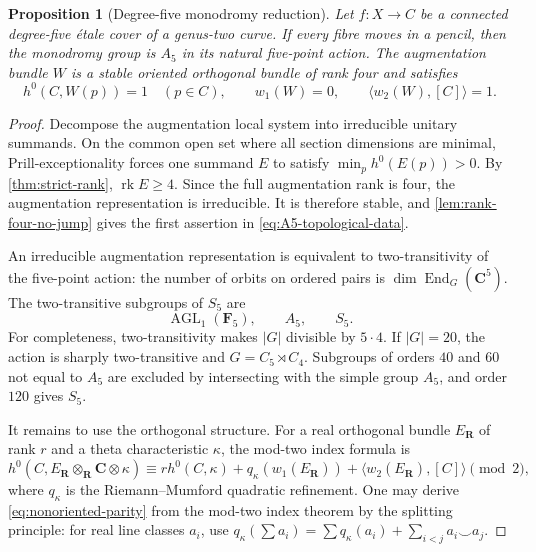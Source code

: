 \documentclass[11pt,reqno]{amsart}
\numberwithin{equation}{section}
\newtheorem{proposition}[proposition]{Proposition}
\theoremstyle{remark}
\DeclareMathOperator{\rk}{rk}
\newcommand{\bC}{\mathbf C}
\begin{document}
\begin{proposition}[Degree-five monodromy reduction]
\label{prop:degree-five-reduction}
Let \(f\colon X\to C\) be a connected degree-five \'etale cover of a
genus-two curve.  If every fibre moves in a pencil, then the monodromy
group is \(A_5\) in its natural five-point action.  The augmentation
bundle \(W\) is a stable oriented orthogonal bundle of rank four and
satisfies
\[
 h^0(C,W(p))=1\quad(p\in C),\qquad
 w_1(W)=0,\qquad \langle w_2(W),[C]\rangle=1.
\tag{6.19}\label{eq:A5-topological-data}
\]
\end{proposition}

\begin{proof}
Decompose the augmentation local system into irreducible unitary
summands.  On the common open set where all section dimensions are
minimal, Prill-exceptionality forces one summand \(E\) to satisfy
\(\min_p h^0(E(p))>0\).  By \cref{thm:strict-rank},
\(\rk E\geq4\).  Since the full augmentation rank is four, the
augmentation representation is irreducible.  It is therefore stable,
and \cref{lem:rank-four-no-jump} gives the first assertion in
\eqref{eq:A5-topological-data}.

An irreducible augmentation representation is equivalent to
two-transitivity of the five-point action: the number of orbits on
ordered pairs is
\(\dim\operatorname{End}_G(\bC^5)\).  The two-transitive subgroups of
\(S_5\) are
\[
 \operatorname{AGL}_1(\mathbf F_5),\qquad A_5,\qquad S_5.
\tag{6.20}\label{eq:degree-five-groups}
\]
For completeness, two-transitivity makes \(|G|\) divisible by
\(5\cdot4\).  If \(|G|=20\), the action is sharply two-transitive and
\(G=C_5\rtimes C_4\).  Subgroups of orders \(40\) and \(60\) not equal
to \(A_5\) are excluded by intersecting with the simple group \(A_5\),
and order \(120\) gives \(S_5\).

It remains to use the orthogonal structure.  For a real orthogonal
bundle \(E_{\mathbf R}\) of rank \(r\) and a theta characteristic
\(\kappa\), the mod-two index formula \cite{AtiyahSpin} is
\[
 h^0(C,E_{\mathbf R}\otimes_{\mathbf R}\bC\otimes\kappa)
 \equiv r h^0(C,\kappa)+q_\kappa(w_1(E_{\mathbf R}))
 +\langle w_2(E_{\mathbf R}),[C]\rangle\pmod2,
\tag{6.21}\label{eq:nonoriented-parity}
\]
where \(q_\kappa\) is the Riemann--Mumford quadratic refinement.  One
may derive \eqref{eq:nonoriented-parity} from the mod-two index theorem
by the splitting principle: for real line classes \(a_i\), use
\(q_\kappa(\sum a_i)=\sum q_\kappa(a_i)+
\sum_{i<j}a_i\smile a_j\).


\end{proof}
\end{document}
